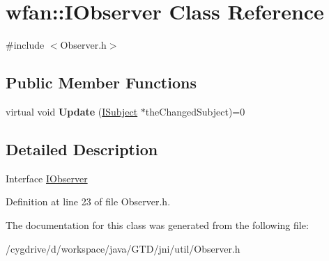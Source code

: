 \hypertarget{classwfan_1_1IObserver}{\section{wfan\-:\-:I\-Observer Class Reference}
\label{classwfan_1_1IObserver}
}


{\ttfamily \#include $<$Observer.\-h$>$}

\subsection*{Public Member Functions}
\begin{DoxyCompactItemize}
\item 
\hypertarget{classwfan_1_1IObserver_a9c85f7615eb11c5167084a5e8ac9af0b}{virtual void {\bfseries Update} (\hyperlink{classwfan_1_1ISubject}{I\-Subject} $\ast$the\-Changed\-Subject)=0}\label{classwfan_1_1IObserver_a9c85f7615eb11c5167084a5e8ac9af0b}

\end{DoxyCompactItemize}


\subsection{Detailed Description}
Interface \hyperlink{classwfan_1_1IObserver}{I\-Observer} 

Definition at line 23 of file Observer.\-h.



The documentation for this class was generated from the following file\-:\begin{DoxyCompactItemize}
\item 
/cygdrive/d/workspace/java/\-G\-T\-D/jni/util/Observer.\-h\end{DoxyCompactItemize}
